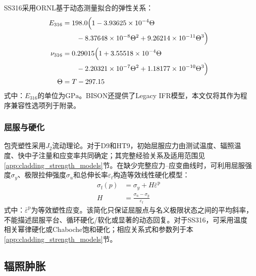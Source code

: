 SS316采用ORNL基于动态测量拟合的弹性关系\cite{Hammond1979ornl5442}：
\begin{subequations}\label{eq:ss316_elastic_properties}
	\begin{align}
		E_{316}
		&=198.0\Bigl(
		1-3.93625\times10^{-4}\Theta
		\notag\\
		&\qquad
		-8.37648\times10^{-8}\Theta^2
		+9.26214\times10^{-11}\Theta^3
		\Bigr)
		\label{eq:ss316_youngs_modulus}\\
		\nu_{316}
		&=0.29015\Bigl(
		1+3.55518\times10^{-4}\Theta
		\notag\\
		&\qquad
		-2.20321\times10^{-7}\Theta^2
		+1.18177\times10^{-10}\Theta^3
		\Bigr)
		\label{eq:ss316_poisson_ratio}\\
		\Theta&=T-297.15
		\label{eq:ss316_reduced_temperature}
	\end{align}
\end{subequations}
\noindent 式中：$E_{316}$的单位为$\mathrm{GPa}$。BISON还提供了Legacy IFR模型，本文仅将其作为程序兼容性选项列于附录。

\subsubsection{屈服与硬化}

包壳塑性采用$J_2$流动理论。对于D9和HT9，初始屈服应力由测试温度、辐照温度、快中子注量和应变率共同确定；其完整经验关系及适用范围见\ref{app:cladding_strength_models}节。在缺少完整应力--应变曲线时，可利用屈服强度$\sigma_y$、极限拉伸强度$\sigma_u$和总伸长率$\varepsilon_t$构造等效线性硬化模型：
\begin{subequations}\label{eq:clad_linear_hardening}
	\begin{align}
		\sigma_{\mathrm f}(p)&=\sigma_y+H\bar{\varepsilon}^{\mathrm{p}}
		\label{eq:clad_flow_stress}\\
		H&=\frac{\sigma_u-\sigma_y}{\varepsilon_t}
		\label{eq:clad_hardening_modulus}
	\end{align}
\end{subequations}
\noindent 式中：$\bar{\varepsilon}^{\mathrm{p}}$为等效塑性应变。该简化只保证屈服点与名义极限状态之间的平均斜率，不能描述屈服平台、循环硬化/软化或显著的动态回复。对于SS316，可采用温度相关幂律硬化或Chaboche饱和硬化；相应关系式和参数列于本\ref{app:cladding_strength_models}节。

\subsection{辐照肿胀}
\label{sec:cladding_irradiation_swelling}


